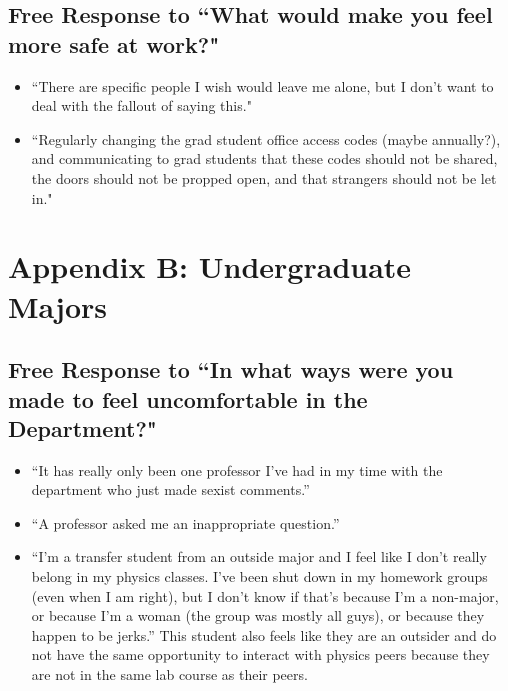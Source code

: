 \documentclass[oneside]{book}   %
\begin{document}
\subsection{Free Response to ``What would make you feel more safe at work?"}

\begin{itemize}
	\item ``There are specific people I wish would leave me alone, but I don't want to deal with the fallout of saying this."
	\item ``Regularly changing the grad student office access codes (maybe annually?), and communicating to grad students that these codes should not be shared, the doors should not be propped open, and that strangers should not be let in."
\end{itemize}

\section{Appendix B: Undergraduate Majors}
\label{sec:free_response_majors}

\subsection{Free Response to ``In what ways were you made to feel uncomfortable in the Department?"}
\begin{itemize}
	\item “It has really only been one professor I’ve had in my time with the department who just made sexist comments.”
	\item “A professor asked me an inappropriate question.”
	\item “I'm a transfer student from an outside major and I feel like I don't really belong in my physics classes. I've been shut down in my homework groups (even when I am right), but I don't know if that's because I'm a non-major, or because I'm a woman (the group was mostly all guys), or because they happen to be jerks.” This student also feels like they are an outsider and do not have the same opportunity to interact with physics peers because they are not in the same lab course as their peers.
\end{itemize}
\end{document}
